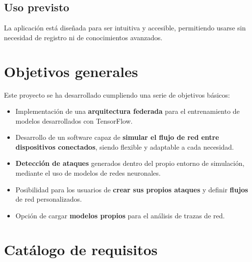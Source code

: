 \subsection{Uso previsto}
\label{subsec:UsoPrevisto}
La aplicación está diseñada para ser intuitiva y accesible, permitiendo usarse sin necesidad de registro ni de conocimientos avanzados.

\section{Objetivos generales}
\label{sec:Objetivos}
Este proyecto se ha desarrollado cumpliendo una serie de objetivos básicos:
\begin{itemize}
    \item Implementación de una \textbf{arquitectura federada} para el entrenamiento de modelos desarrollados con TensorFlow.
    \item Desarrollo de un software capaz de \textbf{simular el flujo de red entre dispositivos conectados}, siendo flexible y adaptable a cada necesidad.
    \item \textbf{Detección de ataques} generados dentro del propio entorno de simulación, mediante el uso de modelos de redes neuronales.
    \item Posibilidad para los usuarios de \textbf{crear sus propios ataques} y definir \textbf{flujos} de red personalizados.
    \item Opción de cargar \textbf{modelos propios} para el análisis de trazas de red.
\end{itemize}

\section{Catálogo de requisitos}
\label{sec:CatalogoRequisitos}

